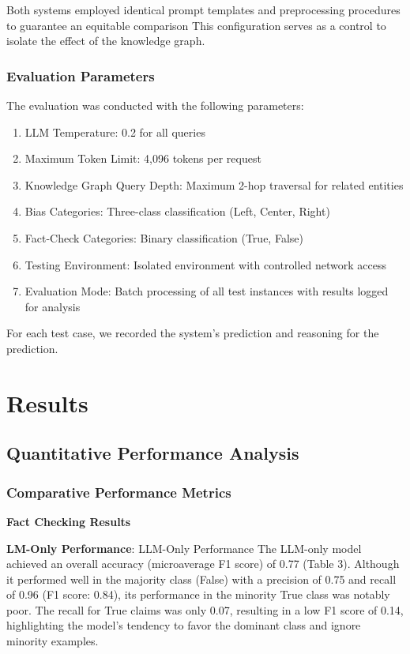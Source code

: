 \documentclass{scrartcl}
\begin{document}
Both systems employed identical prompt templates and preprocessing procedures to guarantee an equitable comparison This configuration serves as a control to isolate the effect of the knowledge graph.

\subsubsection{Evaluation Parameters}
The evaluation was conducted with the following parameters:
\begin{enumerate}
    \item LLM Temperature: 0.2 for all queries 
    \item Maximum Token Limit: 4,096 tokens per request
    \item Knowledge Graph Query Depth: Maximum 2-hop traversal for related entities
    \item Bias Categories: Three-class classification (Left, Center, Right)
    \item Fact-Check Categories: Binary classification (True, False) 
    \item Testing Environment: Isolated environment with controlled network access
    \item Evaluation Mode: Batch processing of all test instances with results logged for analysis
\end{enumerate}
For each test case, we recorded the system’s prediction and reasoning for the prediction. 

\section{Results}
\subsection{Quantitative Performance Analysis}
\subsubsection{Comparative Performance Metrics}

\textbf{Fact Checking Results} 

\textbf{LM-Only Performance}: LLM-Only Performance The LLM-only model achieved an overall accuracy (microaverage F1 score) of 0.77 (Table 3). Although it performed well in the majority class (False) with a precision of 0.75 and recall of 0.96 (F1 score: 0.84), its performance in the minority True class was notably poor. The recall for True claims was only 0.07, resulting in a low F1 score of 0.14, highlighting the model’s tendency to favor the dominant class and ignore minority examples.
 
\end{document}
